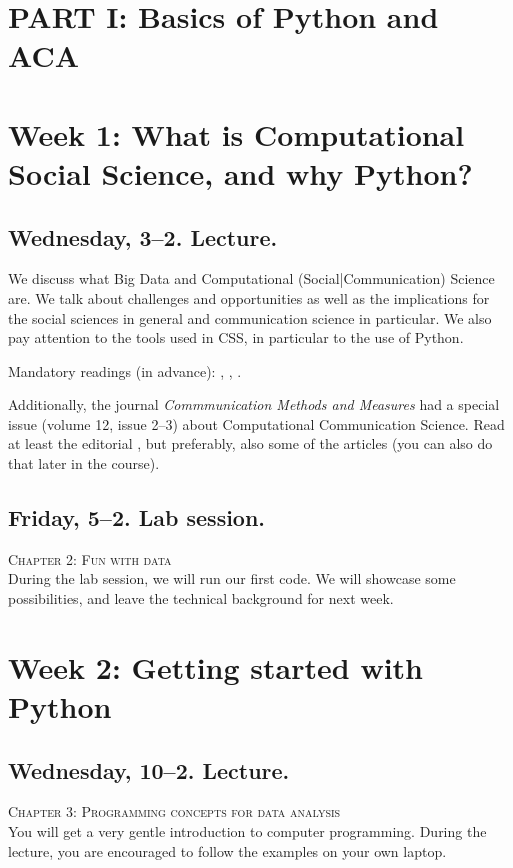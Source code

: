 \section*{PART I: Basics of Python and ACA}

\section*{Week 1: What is Computational Social Science, and why Python?}
\subsection*{Wednesday, 3--2. Lecture.}
We discuss what Big Data and Computational (Social|Communication) Science are. We talk about challenges and opportunities as well as the implications for the social sciences in general and communication science in particular. We also pay attention to the tools used in CSS, in particular to the use of Python.

Mandatory readings (in advance):  \cite{boyd2012}, \cite{Kitchin2014}, \cite{Hilbert2019}.

Additionally, the journal \textit{Commmunication Methods and Measures} had a special issue (volume 12, issue 2--3) about Computational Communication Science. Read at least the editorial \citep{VanAtteveldt2018a}, but preferably, also some of the articles (you can also do that later in the course).


\subsection*{Friday, 5--2. Lab session.}
\textsc{ Chapter 2: Fun with data}\\

During the lab session, we will run our first code. We will showcase some possibilities, and leave the technical background for next week.




\section*{Week 2: Getting started with Python}

\subsection*{Wednesday, 10--2. Lecture.}
\textsc{ Chapter 3: Programming concepts for data analysis}\\
You will get a very gentle introduction to computer programming. During the lecture, you are encouraged to follow the examples on your own laptop.


